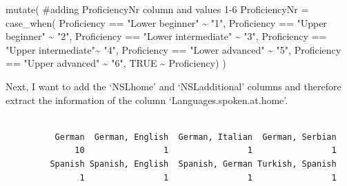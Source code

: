 \documentclass[
  letterpaper,
  DIV=11,
  numbers=noendperiod]{scrartcl}
\newenvironment{Shaded}{\begin{snugshade}}{\end{snugshade}}
\newcommand{\AttributeTok}[1]{\textcolor[rgb]{0.40,0.45,0.13}{#1}}
\newcommand{\CommentTok}[1]{\textcolor[rgb]{0.37,0.37,0.37}{#1}}
\newcommand{\ConstantTok}[1]{\textcolor[rgb]{0.56,0.35,0.01}{#1}}
\newcommand{\FunctionTok}[1]{\textcolor[rgb]{0.28,0.35,0.67}{#1}}
\newcommand{\NormalTok}[1]{\textcolor[rgb]{0.00,0.23,0.31}{#1}}
\newcommand{\SpecialCharTok}[1]{\textcolor[rgb]{0.37,0.37,0.37}{#1}}
\newcommand{\StringTok}[1]{\textcolor[rgb]{0.13,0.47,0.30}{#1}}
\begin{document}
\begin{Shaded}
\begin{Highlighting}[]
  \FunctionTok{mutate}\NormalTok{( }\CommentTok{\#adding ProficiencyNr column and values 1{-}6}
    \AttributeTok{ProficiencyNr =} \FunctionTok{case\_when}\NormalTok{(}
\NormalTok{      Proficiency }\SpecialCharTok{==} \StringTok{"Lower beginner"} \SpecialCharTok{\textasciitilde{}} \StringTok{"1"}\NormalTok{,}
\NormalTok{      Proficiency }\SpecialCharTok{==} \StringTok{"Upper beginner"} \SpecialCharTok{\textasciitilde{}} \StringTok{"2"}\NormalTok{,}
\NormalTok{      Proficiency }\SpecialCharTok{==} \StringTok{"Lower intermediate"} \SpecialCharTok{\textasciitilde{}} \StringTok{"3"}\NormalTok{,}
\NormalTok{      Proficiency }\SpecialCharTok{==} \StringTok{"Upper intermediate"}\SpecialCharTok{\textasciitilde{}} \StringTok{"4"}\NormalTok{,}
\NormalTok{      Proficiency }\SpecialCharTok{==} \StringTok{"Lower advanced"} \SpecialCharTok{\textasciitilde{}} \StringTok{"5"}\NormalTok{,}
\NormalTok{      Proficiency }\SpecialCharTok{==} \StringTok{"Upper advanced"} \SpecialCharTok{\textasciitilde{}} \StringTok{"6"}\NormalTok{,}
      \ConstantTok{TRUE} \SpecialCharTok{\textasciitilde{}}\NormalTok{ Proficiency)}
\NormalTok{    )}
\end{Highlighting}
\end{Shaded}

Next, I want to add the `NSLhome' and `NSLadditional' columns and
therefore extract the information of the column
`Languages.spoken.at.home'.

\begin{Shaded}
\end{Shaded}

\begin{verbatim}

          German  German, English  German, Italian  German, Serbian 
              10                1                1                1 
         Spanish Spanish, English  Spanish, German Turkish, Spanish 
               1                1                1                1 
\end{verbatim}

\begin{Shaded}
\end{Shaded}
\end{document}
